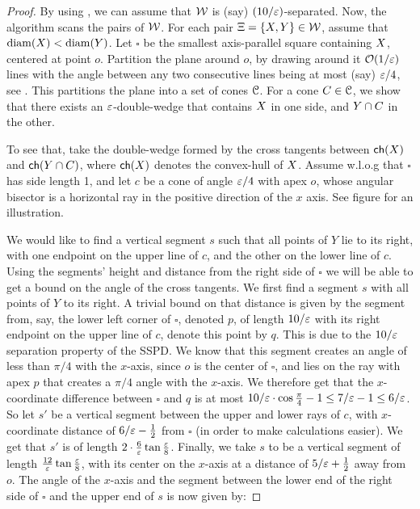 \documentclass[12pt]{article}%
\begin{document}
\begin{proof}
    By using , we can assume that $\mathcal{W}$ is (say)
    $(10/\varepsilon)$-separated.  Now, the algorithm scans the pairs of
    $\mathcal{W}$. For each pair $\Xi = \{ X, Y \} \in \mathcal{W}$, assume
    that $\diameterX{\PSX} < \diameterX{\PSY}$. Let $\square$ be the
    smallest axis-parallel square containing $X$, centered at point
    $o$.  Partition the plane around $o$, by drawing around it
    $\mathcal{O}(1/\varepsilon)$ lines with the angle between any two consecutive
    lines being at most (say) $\varepsilon/4$, see . This
    partitions the plane into a set of cones $\EuScript{C}$. For a cone
    $C \in \EuScript{C}$, we show that there exists an $\varepsilon$-double-wedge
    that contains $X$ in one side, and $Y \cap C$ in the other.

    To see that, take the double-wedge formed by the cross tangents
    between $\CHX{\PSX}$ and $\CHX{\PSY \cap C}$, where $\CHX{\PSX}$
    denotes the convex-hull of $X$. Assume w.l.o.g that $\square$
    has side length 1, and let $c$ be a cone of angle $\varepsilon / 4$ with
    apex $o$, whose angular bisector is a horizontal ray in the
    positive direction of the $x$ axis. See figure
     for an illustration.

    We would like to find a vertical segment $s$ such that all points
    of $Y$ lie to its right, with one endpoint on the upper line of
    $c$, and the other on the lower line of $c$. Using the segments'
    height and distance from the right side of $\square$ we will be
    able to get a bound on the angle of the cross tangents. We first
    find a segment $s$ with all points of $Y$ to its right. A trivial
    bound on that distance is given by the segment from, say, the
    lower left corner of $\square$, denoted $p$, of length $10/\varepsilon$
    with its right endpoint on the upper line of $c$, denote this
    point by $q$. This is due to the $10/\varepsilon$ separation property of
    the SSPD. We know that this segment creates an angle of less than
    $\pi/4$ with the $x$-axis, since $o$ is the center of $\square$,
    and lies on the ray with apex $p$ that creates a $\pi/4$ angle
    with the $x$-axis. We therefore get that the $x$-coordinate
    difference between $\square$ and $q$ is at most
    $10/\varepsilon\cdot \cos\frac{\pi}{4}-1\leq 7/\varepsilon-1\leq 6/\varepsilon$. So let
    $s'$ be a vertical segment between the upper and lower rays of
    $c$, with $x$-coordinate distance of $6/\varepsilon-\frac{1}{2}$ from
    $\square$ (in order to make calculations easier). We get that $s'$
    is of length $2\cdot \frac{6}{\varepsilon}\tan \frac{\varepsilon}{8}$. Finally,
    we take $s$ to be a vertical segment of length
    $\frac{12}{\varepsilon}\tan \frac{\varepsilon}{8}$, with its center on the
    $x$-axis at a distance of $5/\varepsilon+\frac{1}{2}$ away from $o$. The
    angle of the $x$-axis and the segment between the lower end of the
    right side of $\square$ and the upper end of $s$ is now given by:


\end{proof}
\end{document}

